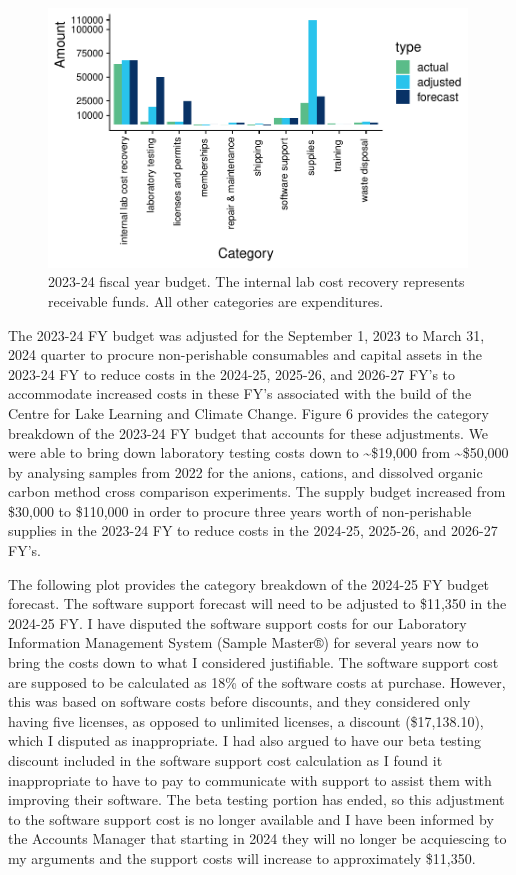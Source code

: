 \documentclass[
]{article}
\begin{document}
\begin{figure}[h]
\centering
  \includegraphics[width=0.99\textwidth]{2023_24FY_budget.pdf}
  \caption{2023-24 fiscal year budget. The internal lab cost recovery represents receivable funds. All other categories are expenditures.}
\end{figure}

The 2023-24 FY budget was adjusted for the September 1, 2023 to March
31, 2024 quarter to procure non-perishable consumables and capital
assets in the 2023-24 FY to reduce costs in the 2024-25, 2025-26, and
2026-27 FY's to accommodate increased costs in these FY's associated
with the build of the Centre for Lake Learning and Climate Change.
Figure 6 provides the category breakdown of the 2023-24 FY budget that
accounts for these adjustments. We were able to bring down laboratory
testing costs down to \textasciitilde\$19,000 from
\textasciitilde\$50,000 by analysing samples from 2022 for the anions,
cations, and dissolved organic carbon method cross comparison
experiments. The supply budget increased from \$30,000 to \$110,000 in
order to procure three years worth of non-perishable supplies in the
2023-24 FY to reduce costs in the 2024-25, 2025-26, and 2026-27 FY's.

\pagebreak

The following plot provides the category breakdown of the 2024-25 FY
budget forecast. The software support forecast will need to be adjusted
to \$11,350 in the 2024-25 FY. I have disputed the software support
costs for our Laboratory Information Management System (Sample Master®)
for several years now to bring the costs down to what I considered
justifiable. The software support cost are supposed to be calculated as
18\% of the software costs at purchase. However, this was based on
software costs before discounts, and they considered only having five
licenses, as opposed to unlimited licenses, a discount (\$17,138.10),
which I disputed as inappropriate. I had also argued to have our beta
testing discount included in the software support cost calculation as I
found it inappropriate to have to pay to communicate with support to
assist them with improving their software. The beta testing portion has
ended, so this adjustment to the software support cost is no longer
available and I have been informed by the Accounts Manager that starting
in 2024 they will no longer be acquiescing to my arguments and the
support costs will increase to approximately \$11,350.
\end{document}

